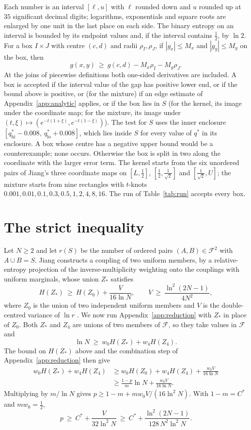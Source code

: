 \documentclass[12pt]{article}
\theoremstyle{plain}
\newcommand{\cF}{\mathcal{F}}
\newcommand{\qs}{q^{*}}
\newcommand{\Cs}{C^{*}}
\begin{document}
Each number is an interval $[\ell,u]$ with $\ell$ rounded down and $u$ rounded up at $35$ significant decimal digits; logarithms, exponentials and square roots are enlarged by one unit in the last place on each side. The binary entropy on an interval is bounded by its endpoint values and, if the interval contains $\frac12$, by $\ln 2$. For a box $I\times J$ with centre $(c,d)$ and radii $\rho_I,\rho_J$, if $|g_x|\le M_x$ and $|g_y|\le M_y$ on the box, then
\[
g(x,y)\ \ge\ g(c,d)-M_x\rho_I-M_y\rho_J .
\]
At the joins of piecewise definitions both one-sided derivatives are included. A box is accepted if the interval value of the gap has positive lower end, or if the bound above is positive, or (for the mixture) if an edge estimate of Appendix~\ref{app:analytic} applies, or if the box lies in $S$ (for the kernel, its image under the coordinate map; for the mixture, its image under $(t,\xi)\mapsto(e^{-t(1+\xi)},e^{-t(1-\xi)})$). The test for $S$ uses the inner enclosure $[\qs_{\mathrm{hi}}-0.008,\ \qs_{\mathrm{lo}}+0.008]$, which lies inside $S$ for every value of $\qs$ in its enclosure. A box whose centre has a negative upper bound would be a counterexample; none occurs. Otherwise the box is split in two along the coordinate with the larger error term. The kernel starts from the six unordered pairs of Jiang's three coordinate maps on $[L,\frac12]$, $[\frac12,\frac1{\sqrt2}]$ and $[\frac1{\sqrt2},U]$; the mixture starts from nine rectangles with $t$-knots $0.001,0.01,0.1,0.3,0.5,1,2,4,8,16$. The run of Table~\ref{tab:run} accepts every box.

\section{The strict inequality}\label{app:strict}

Let $N\ge2$ and let $r(S)$ be the number of ordered pairs $(A,B)\in\cF^2$ with $A\cup B=S$. Jiang \cite[Section~10]{Jia26} constructs a coupling of two uniform members, by a relative-entropy projection of the inverse-multiplicity weighting onto the couplings with uniform marginals, whose union $Z_*$ satisfies
\[
H(Z_*)\ \ge\ H(Z_0)+\frac{V}{16\ln N},\qquad V\ \ge\ \frac{\ln^2(2N-1)}{4N^2},
\]
where $Z_0$ is the union of two independent uniform members and $V$ is the double-centred variance of $\ln r$ \cite[Theorem~10.2]{Jia26}. We now run Appendix~\ref{app:reduction} with $Z_*$ in place of $Z_0$. Both $Z_*$ and $Z_4$ are unions of two members of $\cF$, so they take values in $\cF$ and
\[
\ln N\ \ge\ w_0H(Z_*)+w_4H(Z_4).
\]
The bound on $H(Z_*)$ above and the combination step of Appendix~\ref{app:reduction} then give
\begin{align*}
w_0H(Z_*)+w_4H(Z_4)&\ge w_0H(Z_0)+w_4H(Z_4)+\frac{w_0V}{16\ln N}\\
&\ge \frac{1-p}{m}\ln N+\frac{w_0V}{16\ln N}.
\end{align*}
Multiplying by $m/\ln N$ gives $p\ge 1-m+mw_0V/(16\ln^2N)$. With $1-m=\Cs$ and $mw_0=\frac12$,
\[
p\ \ge\ \Cs+\frac{V}{32\ln^2N}\ \ge\ \Cs+\frac{\ln^2(2N-1)}{128\,N^2\ln^2 N}.
\]
\end{document}
